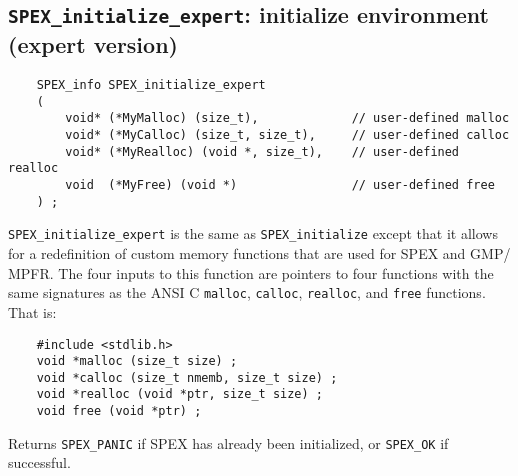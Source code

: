 \documentclass[12pt]{report}
\theoremstyle{definition}
\begin{document}
\subsection{\texttt{SPEX\_initialize\_expert}: initialize environment (expert version)}\label{ss:SPEX_initialize_expert}

\begin{mdframed}[userdefinedwidth=6in]
{\footnotesize
\begin{verbatim}
    SPEX_info SPEX_initialize_expert
    (
        void* (*MyMalloc) (size_t),             // user-defined malloc
        void* (*MyCalloc) (size_t, size_t),     // user-defined calloc
        void* (*MyRealloc) (void *, size_t),    // user-defined realloc
        void  (*MyFree) (void *)                // user-defined free
    ) ;
\end{verbatim}
} \end{mdframed}

\verb|SPEX_initialize_expert| is the same as \verb|SPEX_initialize| except that
it allows for a redefinition of custom memory functions that are used for SPEX
and GMP/ MPFR.  The four inputs to this function are pointers to four
functions with the same signatures as the ANSI C \verb'malloc', \verb'calloc',
\verb'realloc', and \verb'free' functions.  That is:

\begin{mdframed}[userdefinedwidth=6in]
{\footnotesize
\begin{verbatim}
    #include <stdlib.h>
    void *malloc (size_t size) ;
    void *calloc (size_t nmemb, size_t size) ;
    void *realloc (void *ptr, size_t size) ;
    void free (void *ptr) ;
\end{verbatim}
} \end{mdframed}

Returns \verb|SPEX_PANIC| if SPEX has already been initialized,
or \verb|SPEX_OK| if successful.

\newpage
\end{document}
